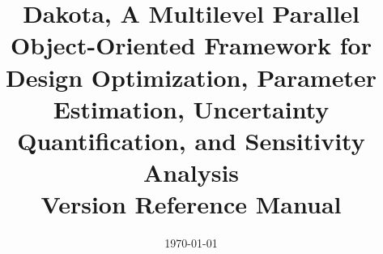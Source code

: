 \documentclass[ps2pdf,11pt,report]{SANDreport}
\title{Dakota, A Multilevel Parallel Object-Oriented Framework for 
Design Optimization, Parameter Estimation, Uncertainty Quantification, 
and Sensitivity Analysis\\\vspace{5mm}Version \DakotaVersion\space Reference Manual}
\author{\DakotaAuthorLong}
\date{\today}
\begin{document}
\maketitle

\begin{abstract}
\DakotaAbstractShared
\DakotaAbstractRef
\end{abstract}

\setcounter{page}{3}
\clearemptydoublepage

\tableofcontents
\clearemptydoublepage

\SANDmain 

\end{document}
